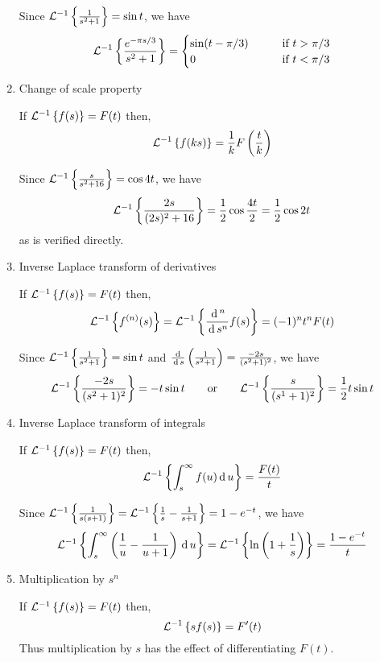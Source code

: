 \documentclass[../main-sheet.tex]{subfiles}
\begin{document}
\begin{enumerate}
    \begin{ex}
        Since $ \mathcal{L}^{-1}\left\{ \frac{1}{s^2+1}\right\}=\sin t $, we have 
        \[
            \mathcal{L}^{-1}\left\{ \frac{e^{-\pi s/3}}{s^2+1}\right\}=\begin{cases}
                \sin (t-\pi/3) &\qquad \text{if } t>\pi/3\\
                0 & \qquad \text{if } t<\pi/3
            \end{cases}
        \]
    \end{ex}
    \item Change of scale property
    \begin{thm}
        If $ \mathcal{L}^{-1}\left\{ f(s)\right\}=F(t) $ then,
        \[
            \mathcal{L}^{-1}\left\{ f(ks)\right\}=\frac{1}{k}F\left( \frac{t}{k} \right)
        \]
    \end{thm}
    \begin{ex}
        Since $ \mathcal{L}^{-1}\left\{ \frac{s}{s^2+16}\right\}=\cos 4t $, we have 
        \[
            \mathcal{L}^{-1}\left\{ \frac{2s}{(2s)^2+16}\right\}=\frac{1}{2}\cos \frac{4t}{2}=\frac{1}{2}\cos 2t
        \]
        as is verified directly.
    \end{ex}
    \item Inverse Laplace transform of derivatives
    \begin{thm}
        If $ \mathcal{L}^{-1}\left\{ f(s)\right\}=F(t) $ then,
        \[
            \mathcal{L}^{-1}\left\{ f^{(n)}(s)\right\}=\mathcal{L}^{-1}\left\{ \frac{\,\mathrm{d}\,^n}{\,\mathrm{d}\, s^n}f(s)\right\}=(-1)^n t^n F(t)
        \] 
    \end{thm}
    \begin{ex}
        Since $ \mathcal{L}^{-1}\left\{ \frac{1}{s^2+1}\right\}=\sin t $ and $ \frac{\,\mathrm{d}\, }{\,\mathrm{d}\, s}\left( \frac{1}{s^2+1} \right)=\frac{-2s}{(s^2+1)^2} $, we have 
        \[\mathcal{L}^{-1}\left\{ \frac{-2s}{(s^2+1)^2}\right\}=-t\sin t\qquad \text{or} \qquad \mathcal{L}^{-1}\left\{ \frac{s}{(s^1+1)^2}\right\}=\frac{1}{2}t\sin t\]
    \end{ex}
    \newpage
    \item Inverse Laplace transform of integrals
    \begin{thm}
        If $ \mathcal{L}^{-1}\left\{ f(s)\right\}=F(t) $ then,
        \[
            \mathcal{L}^{-1}\left\{ \int_s^\infty f(u) \,\mathrm{d}\, u \right\}=\frac{F(t)}{t}
        \] 
    \end{thm}
    \begin{ex}
        Since $ \mathcal{L}^{-1}\left\{ \frac{1}{s(s+1)}\right\}=\mathcal{L}^{-1}\left\{ \frac{1}{s}-\frac{1}{s+1}\right\}=1-e^{-t}$, we have 
        \[
            \mathcal{L}^{-1}\left\{ \int_s^\infty \left( \frac{1}{u}-\frac{1}{u+1} \right)\,\mathrm{d}\, u\right\}=\mathcal{L}^{-1}\left\{ \ln\left( 1+\frac{1}{s} \right)\right\}=\frac{1-e^{-t}}{t}
        \]
    \end{ex}
    \item Multiplication by $ s^n $
    \begin{thm}
        If $ \mathcal{L}^{-1}\left\{ f(s)\right\}=F(t) $ then,
        \[
            \mathcal{L}^{-1}\left\{ s f(s)\right\}=F'(t)
        \] 
        Thus multiplication by $ s $ has the effect of differentiating $ F(t) $.


\end{thm}
\end{enumerate}
\end{document}

